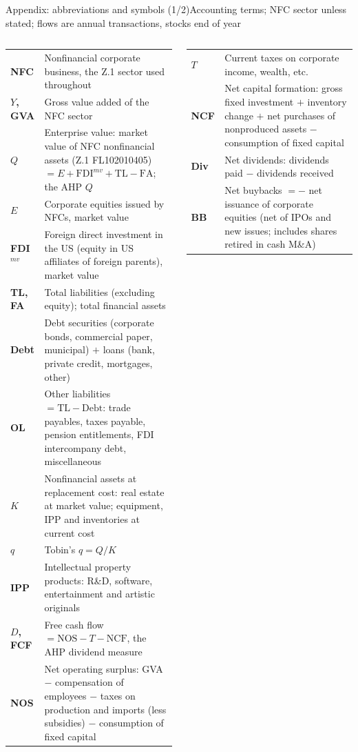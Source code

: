 \documentclass[aspectratio=169,10pt,t]{beamer}
\begin{document}
\newcommand{\gl}[2]{\textbf{#1} & #2\\}
\begin{frame}{Appendix: abbreviations and symbols (1/2)}{Accounting terms; NFC sector unless stated; flows are annual transactions, stocks end of year}
\vspace{-0.05cm}
\begin{columns}[T]
{\tiny\setlength{\tabcolsep}{3pt}\renewcommand{\arraystretch}{1.12}
\begin{tabular}{@{}>{\raggedright}p{0.17\linewidth}p{0.79\linewidth}@{}}\toprule
\gl{NFC}{Nonfinancial corporate business, the Z.1 sector used throughout}
\gl{$Y$, GVA}{Gross value added of the NFC sector}
\gl{$Q$}{Enterprise value: market value of NFC nonfinancial assets (Z.1 FL102010405) $=E+\mathrm{FDI}^{mv}+\mathrm{TL}-\mathrm{FA}$; the AHP $Q$}
\gl{$E$}{Corporate equities issued by NFCs, market value}
\gl{FDI$^{mv}$}{Foreign direct investment in the US (equity in US affiliates of foreign parents), market value}
\gl{TL, FA}{Total liabilities (excluding equity); total financial assets}
\gl{Debt}{Debt securities (corporate bonds, commercial paper, municipal) $+$ loans (bank, private credit, mortgages, other)}
\gl{OL}{Other liabilities $=\mathrm{TL}-\mathrm{Debt}$: trade payables, taxes payable, pension entitlements, FDI intercompany debt, miscellaneous}
\gl{$K$}{Nonfinancial assets at replacement cost: real estate at market value; equipment, IPP and inventories at current cost}
\gl{$q$}{Tobin's $q=Q/K$}
\gl{IPP}{Intellectual property products: R\&D, software, entertainment and artistic originals}
\gl{$D$, FCF}{Free cash flow $=\mathrm{NOS}-T-\mathrm{NCF}$, the AHP dividend measure}
\gl{NOS}{Net operating surplus: GVA $-$ compensation of employees $-$ taxes on production and imports (less subsidies) $-$ consumption of fixed capital}\bottomrule
\end{tabular}}
{\tiny\setlength{\tabcolsep}{3pt}\renewcommand{\arraystretch}{1.12}
\begin{tabular}{@{}>{\raggedright}p{0.17\linewidth}p{0.79\linewidth}@{}}\toprule
\gl{$T$}{Current taxes on corporate income, wealth, etc.}
\gl{NCF}{Net capital formation: gross fixed investment $+$ inventory change $+$ net purchases of nonproduced assets $-$ consumption of fixed capital}
\gl{Div}{Net dividends: dividends paid $-$ dividends received}
\gl{BB}{Net buybacks $=-$ net issuance of corporate equities (net of IPOs and new issues; includes shares retired in cash M\&A)}

\end{tabular}}
\end{columns}
\end{frame}
\end{document}
